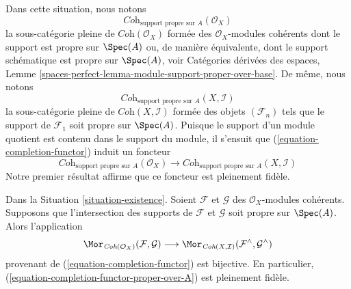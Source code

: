 \noindent
Dans cette situation, nous notons
$$
\textit{Coh}_{\text{support propre sur } A}(\mathcal{O}_X)
$$
la sous-catégorie pleine de $\textit{Coh}(\mathcal{O}_X)$
formée des $\mathcal{O}_X$-modules cohérents dont le
support est propre sur $\Spec(A)$ ou, de manière équivalente, dont le
support schématique est propre sur $\Spec(A)$, voir
Catégories dérivées des espaces, Lemme
\ref{spaces-perfect-lemma-module-support-proper-over-base}.
De même, nous notons
$$
\textit{Coh}_{\text{support propre sur } A}(X, \mathcal{I})
$$
la sous-catégorie pleine de $\textit{Coh}(X, \mathcal{I})$
formée des objets $(\mathcal{F}_n)$ tels que
le support de $\mathcal{F}_1$ soit propre sur $\Spec(A)$.
Puisque le support d'un module quotient est contenu dans le support
du module, il s'ensuit que (\ref{equation-completion-functor})
induit un foncteur
\begin{equation}
\label{equation-completion-functor-proper-over-A}
\textit{Coh}_{\text{support propre sur }A}(\mathcal{O}_X)
\longrightarrow
\textit{Coh}_{\text{support propre sur }A}(X, \mathcal{I})
\end{equation}
Notre premier résultat affirme que ce foncteur est pleinement fidèle.

\begin{lemma}
\label{lemma-fully-faithful}
Dans la Situation \ref{situation-existence}.
Soient $\mathcal{F}$ et $\mathcal{G}$ des $\mathcal{O}_X$-modules cohérents.
Supposons que l'intersection des supports de
$\mathcal{F}$ et $\mathcal{G}$ soit propre sur $\Spec(A)$. Alors l'application
$$
\Mor_{\textit{Coh}(\mathcal{O}_X)}(\mathcal{F}, \mathcal{G})
\longrightarrow
\Mor_{\textit{Coh}(X, \mathcal{I})}
(\mathcal{F}^\wedge, \mathcal{G}^\wedge)
$$
provenant de (\ref{equation-completion-functor}) est bijective.
En particulier, (\ref{equation-completion-functor-proper-over-A})
est pleinement fidèle.
\end{lemma}

